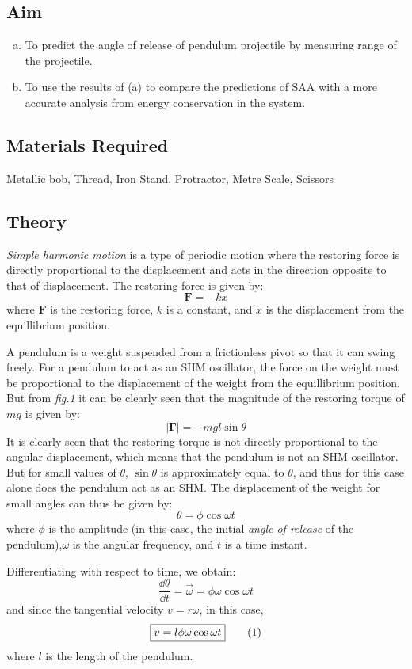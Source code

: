 \subsection{Aim}
\begin{enumerate}[(a)]
\item To predict the angle of release of pendulum projectile by measuring range of the projectile.
\item To use the results of (a) to compare the predictions of SAA with a more accurate analysis from energy conservation in the system. 
\end{enumerate}
\subsection{Materials Required}
Metallic bob, Thread, Iron Stand, Protractor, Metre Scale, Scissors
\subsection{Theory}
\emph{Simple harmonic motion} is a type of periodic motion where the restoring force is directly proportional to the displacement and acts in the direction opposite to that of displacement. The restoring force is given by:
\[
  \mathbf{F}=-kx
\]
where $\mathbf{F}$ is the restoring force, $k$ is a constant, and $x$ is the displacement from the equillibrium position.

A pendulum is a weight suspended from a frictionless pivot so that it can swing freely. For a pendulum to act as an SHM oscillator, the force on the weight must be proportional to the displacement of the weight from the equillibrium position. But from \textit{fig.1} it can be clearly seen that the magnitude of the restoring torque of $mg$ is given by:
\[
  |\bm{\Gamma}|=-mgl\sin\theta
\]
It is clearly seen that the restoring torque is not directly proportional to the angular displacement, which means that the pendulum is not an SHM oscillator. But for small values of $\theta$, $\sin\theta$ is approximately equal to $\theta$, and thus for this case alone does the pendulum act as an SHM. The displacement of the weight for small angles can thus be given by:
\[
  \theta=\phi\cos\omega t
\]
where $\phi$ is the amplitude (in this case, the initial \emph{angle of release} of the pendulum),$\omega$ is the angular frequency, and $t$ is a time instant.

Differentiating with respect to time, we obtain:
\[
  \frac{\dd{\theta}}{\dd{t}}=\vec{\omega}=\phi\omega\cos\omega t
\]
and since the tangential velocity $v=r\omega$, in this case,
\[
  \boxed{v=l\phi\omega\cos\omega t} \numberthis \label{eqn}
\]
where $l$ is the length of the pendulum.

